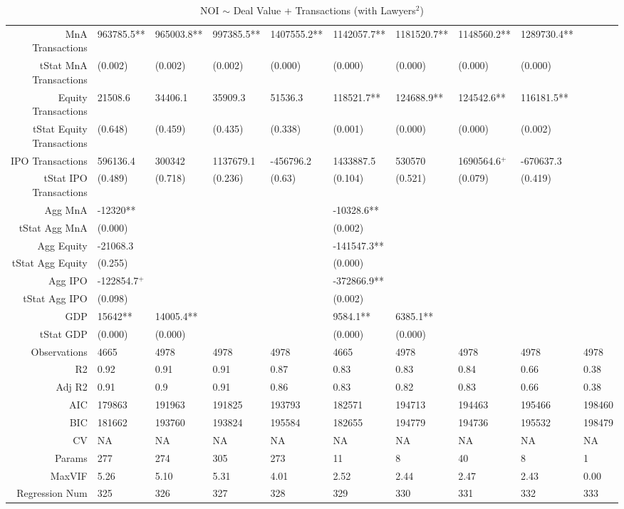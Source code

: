 \begin{table}[ht]
\begin{tabular}{rlllllllll}
  MnA Transactions & 963785.5** & 965003.8** & 997385.5** & 1407555.2** & 1142057.7** & 1181520.7** & 1148560.2** & 1289730.4** &  \\ 
  tStat MnA Transactions & (0.002) & (0.002) & (0.002) & (0.000) & (0.000) & (0.000) & (0.000) & (0.000) &  \\ 
  Equity Transactions & 21508.6 & 34406.1 & 35909.3 & 51536.3 & 118521.7** & 124688.9** & 124542.6** & 116181.5** &  \\ 
  tStat Equity Transactions & (0.648) & (0.459) & (0.435) & (0.338) & (0.001) & (0.000) & (0.000) & (0.002) &  \\ 
  IPO Transactions & 596136.4 & 300342 & 1137679.1 & -456796.2 & 1433887.5 & 530570 & 1690564.6$^{+}$ & -670637.3 &  \\ 
  tStat IPO Transactions & (0.489) & (0.718) & (0.236) & (0.63) & (0.104) & (0.521) & (0.079) & (0.419) &  \\ 
  Agg MnA & -12320** &  &  &  & -10328.6** &  &  &  &  \\ 
  tStat Agg MnA & (0.000) &  &  &  & (0.002) &  &  &  &  \\ 
  Agg Equity & -21068.3 &  &  &  & -141547.3** &  &  &  &  \\ 
  tStat Agg Equity & (0.255) &  &  &  & (0.000) &  &  &  &  \\ 
  Agg IPO & -122854.7$^{+}$ &  &  &  & -372866.9** &  &  &  &  \\ 
  tStat Agg IPO & (0.098) &  &  &  & (0.002) &  &  &  &  \\ 
  GDP & 15642** & 14005.4** &  &  & 9584.1** & 6385.1** &  &  &  \\ 
  tStat GDP & (0.000) & (0.000) &  &  & (0.000) & (0.000) &  &  &  \\ 
  Observations & 4665 & 4978 & 4978 & 4978 & 4665 & 4978 & 4978 & 4978 & 4978 \\ 
  R2 & 0.92 & 0.91 & 0.91 & 0.87 & 0.83 & 0.83 & 0.84 & 0.66 & 0.38 \\ 
  Adj R2 & 0.91 & 0.9 & 0.91 & 0.86 & 0.83 & 0.82 & 0.83 & 0.66 & 0.38 \\ 
  AIC & 179863 & 191963 & 191825 & 193793 & 182571 & 194713 & 194463 & 195466 & 198460 \\ 
  BIC & 181662 & 193760 & 193824 & 195584 & 182655 & 194779 & 194736 & 195532 & 198479 \\ 
  CV & NA & NA & NA & NA & NA & NA & NA & NA & NA \\ 
  Params & 277 & 274 & 305 & 273 & 11 & 8 & 40 & 8 & 1 \\ 
  MaxVIF & 5.26 & 5.10 & 5.31 & 4.01 & 2.52 & 2.44 & 2.47 & 2.43 & 0.00 \\ 
  Regression Num & 325 & 326 & 327 & 328 & 329 & 330 & 331 & 332 & 333 \\ 
   \hline
\end{tabular}
\caption{NOI $\sim$ Deal Value + Transactions (with Lawyers$^2$)} 
\end{table}
